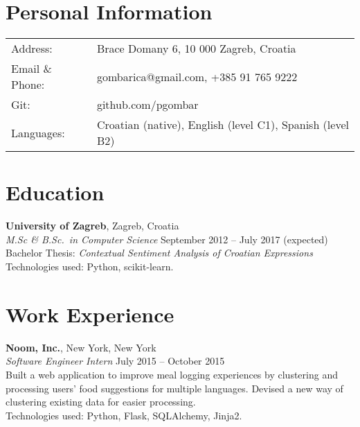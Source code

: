 \documentclass[margin,line]{resume}
\begin{document}
\begin{resume}

\section{\mysidestyle Personal Information}

\begin{tabular}{@{}ll@{}}
Address: & Brace Domany 6, 10 000 Zagreb, Croatia \\
Email \& Phone: & gombarica@gmail.com, +385 91 765 9222 \\
Git: & github.com/pgombar \\
Languages: & Croatian (native), English (level C1), Spanish (level B2) \\
\end{tabular}

\vspace{1mm}
\section{\mysidestyle Education}

\textbf{University of Zagreb}, Zagreb, Croatia \vspace{2mm}\\\vspace{1mm}%
\textsl{M.Sc \& B.Sc.\ in Computer Science} \hfill September 2012 -- July 2017 (expected)\\%
Bachelor Thesis: \textit{Contextual Sentiment Analysis of Croatian Expressions}\\
Technologies used: Python, scikit-learn.
\vspace{-3mm}\hspace{-1mm}\hfill%

\vspace{1mm}
\section{\mysidestyle Work Experience}

\textbf{Noom, Inc.}, New York, New York \vspace{2mm}\\\vspace{1mm}%
\textsl{Software Engineer Intern} \hfill July 2015 -- October 2015\\%
Built a web application to improve meal logging experiences by clustering and processing users' food suggestions for multiple languages. Devised a new way of clustering existing data for easier processing. \\
Technologies used: Python, Flask, SQLAlchemy, Jinja2.


\end{resume}
\end{document}
